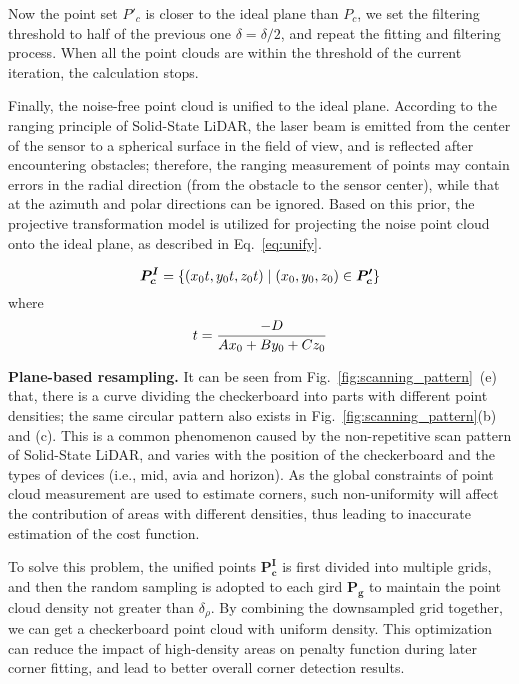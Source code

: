 \documentclass[journal]{vgtc}
\begin{document}
Now the point set ${P'_c}$ is closer to the ideal plane than $P_c$, we set the filtering threshold to half of the previous one $\delta=\delta/2$, and repeat the fitting and filtering process. When all the point clouds are within the threshold of the current iteration, the calculation stops. 

Finally, the noise-free point cloud is unified to the ideal plane. According to the ranging principle of Solid-State LiDAR, the laser beam is emitted from the center of the sensor to a spherical surface in the field of view, and is reflected after encountering obstacles; therefore, the ranging measurement of points may contain errors in the radial direction (from the obstacle to the sensor center), while that at the azimuth and polar directions can be ignored. Based on this prior, the projective transformation model is utilized for projecting the noise point cloud onto the ideal plane, as described in Eq.~\ref{eq:unify}.

\begin{equation}
	\label{eq:unify}
	\centering
	\bm{P^I_c} = \{ (x_0t, y_0t, z_0t) \mid (x_0,y_0,z_0) \in \bm {P'_c} \} 
\end{equation}
where
\begin{equation}
	\label{eq:unify_sub}
	\centering
	t = \frac{-D} {Ax_0 + B y_0 + C z_0} 
\end{equation}

\textbf{Plane-based resampling.} It can be seen from Fig.~\ref{fig:scanning_pattern}~(e) that, there is a curve dividing the checkerboard into parts with different point densities; the same circular pattern also exists in Fig.~\ref{fig:scanning_pattern}(b) and (c). This is a common phenomenon caused by the non-repetitive scan pattern of Solid-State LiDAR, and varies with the position of the checkerboard and the types of devices (i.e., mid, avia and horizon). As the global constraints of point cloud measurement are used to estimate corners, such non-uniformity will affect the contribution of areas with different densities, thus leading to inaccurate estimation of the cost function.

To solve this problem, the unified points $\bm {P^I_c}$ is first divided into multiple grids, and then the random sampling is adopted to each gird $\bm {P_g}$ to maintain the point cloud density not greater than $\delta_{\rho}$. By combining the downsampled grid together, we can get a checkerboard point cloud with uniform density. This optimization can reduce the impact of high-density areas on penalty function during later corner fitting, and lead to better overall corner detection results.
\end{document}
